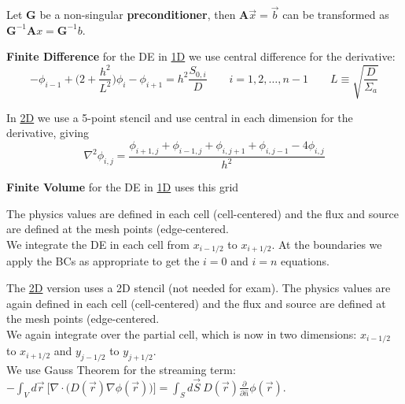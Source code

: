 \documentclass[12pt]{article}
\newcommand{\ve}[1]{\ensuremath{\mathbf{#1}}}
\begin{document}
Let $\ve{G}$ be a non-singular \textbf{preconditioner}, then $\ve{A}\vec{x}=\vec{b}$ can be transformed as $\ve{G}^{-1}\ve{A}x = \ve{G}^{-1}b$.

\textbf{Finite Difference} for the DE in \underline{1D} we use central difference for the derivative: 
\[-\phi_{i-1} + \bigl(2 + \frac{h^2}{L^2}\bigr)\phi_i - \phi_{i+1} = h^2 \frac{S_{0,i}}{D} \qquad i = 1, 2, \dots, n-1 \qquad L \equiv \sqrt{\frac{D}{\Sigma_a}}\]

In \underline{2D} we use a 5-point stencil and use central in each dimension for the derivative, giving
\[ \nabla^2 \phi_{i,j} = \frac{\phi_{i+1,j} + \phi_{i-1,j} + \phi_{i,j+1} + \phi_{i,j-1} - 4\phi_{i,j}}{h^2}\]


\textbf{Finite Volume} for the DE in \underline{1D} uses this grid 
%
\begin{multicols}{2}
\begin{center}
\end{center}
\columnbreak
The physics values are defined in each cell (cell-centered) and the flux and source are defined at the mesh points (edge-centered.\\
We integrate the DE in each cell from $x_{i-1/2}$ to $x_{i+1/2}$. At the boundaries we apply the BCs as appropriate to get the $i=0$ and $i=n$ equations.
\end{multicols}


The \underline{2D} version uses a 2D stencil (not needed for exam). The physics values are again defined in each cell (cell-centered) and the flux and source are defined at the mesh points (edge-centered.\\
We again integrate over the partial cell, which is now in two dimensions: $x_{i-1/2}$ to $x_{i+1/2}$ and $y_{j-1/2}$ to $y_{j+1/2}$.\\
We use Gauss Theorem for the streaming term: $-\int_V d\vec{r}\:\bigl[\nabla \cdot \bigl(D(\vec{r})\nabla \phi(\vec{r})\bigr)\bigr] = \int_S d\vec{S} \:D(\vec{r})\frac{\partial}{\partial \hat{n}}\phi(\vec{r})$.
\end{document}
